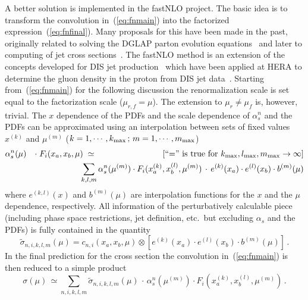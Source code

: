 A better solution is implemented in the fastNLO project.
The basic idea is to transform the convolution 
in~(\ref{eq:fnmain}) into the factorized expression~(\ref{eq:fnfinal}).
Many proposals for this have been made in the past, originally
related to solving the DGLAP parton evolution equations~\cite{Pascaud:1994vx}
and later to computing of jet cross 
sections~\cite{Lobo:1996,Graudenz:1995sk,Kosower:1997vj,Wobisch:2000dk,Carli:2005ji}.
The fastNLO method is an extension of the 
concepts developed for DIS jet production~\cite{Lobo:1996,Wobisch:2000dk}
which have been applied at HERA
to determine the gluon density in the proton from DIS jet data~\cite{Adloff:2000tq}.
%
Starting from~(\ref{eq:fnmain}) for  the following discussion the 
renormalization scale is set equal to the factorization scale 
($\mu_{r,f}=\mu$).
The extension to $\mu_r \ne \mu_f$ is, however, trivial.
The $x$ dependence of the PDFs and the 
scale dependence of $\alpha_s^n$ and the PDFs can be approximated 
using an interpolation between sets of fixed values $x^{(k)}$ 
and $\mu^{(m)}$ 
($k=1, \cdots, k_{\rm max}\,;\,  m =1, \cdots, m_{\rm max}$)
%
\begin{eqnarray}
  &  \alpha^n_s(\mu)&  \cdot \; F_i(x_a,x_b,\mu) \; \simeq 
      \hskip28mm 
{[{\scriptstyle \mbox{``='' is true for 
$k_{\rm max}, l_{\rm max}, m_{\rm max}\rightarrow \infty $} }]}
\nonumber \\
& & 
\sum_{k,l,m}  \alpha^n_s(\mu^{(m)}) \cdot F_i(x_a^{(k)}, x_b^{(l)}, \mu^{(m)}) 
\, \cdot \,  e^{(k)}(x_a) \cdot  e^{(l)}(x_b) \cdot b^{(m)}(\mu)   
\end{eqnarray}
%
where $e^{(k,l)}(x)$ and $b^{(m)}(\mu)$ are interpolation functions
for the $x$ and the $\mu$ dependence, respectively.
All information of the perturbatively calculable piece
(including phase space restrictions, jet definition, etc.\
but excluding $\alpha_s$ and the PDFs)
is fully contained in the quantity
%
\begin{equation}
\tilde{\sigma}_{n,i,k,l,m}(\mu) = 
 c_{n,i}(x_a, x_b, \mu) \otimes 
\left[ e^{(k)}(x_a) \cdot e^{(l)}(x_b)  \cdot b^{(m)}(\mu) \right] \, .
\label{eq:sigmatilde}
\end{equation}
%
In the final prediction for the cross section
the convolution in~(\ref{eq:fnmain}) is then reduced
to a simple product
\begin{equation}
\sigma(\mu) \, \simeq \sum_{n,i,k,l,m} 
\tilde{\sigma}_{n,i,k,l,m}(\mu)  \, \cdot \,
 \alpha^n_s(\mu^{(m)}) \cdot
 F_i(x_a^{(k)}, x_b^{(l)}, \mu^{(m)}) \, .
\label{eq:fnfinal}
\end{equation}
